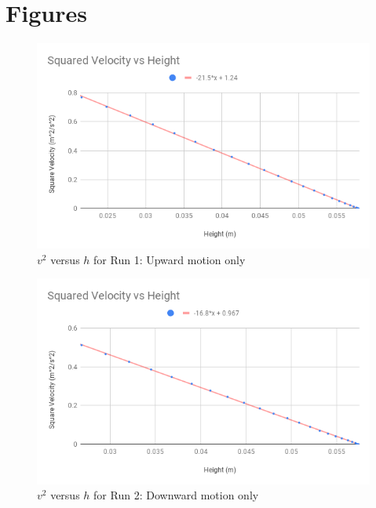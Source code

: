 \section{Figures}
\begin{figure}[ht]
    \centering
    \includegraphics[scale=0.71]{image/07-mechanic/v2-uphill.png}
    \caption{$v^{2}$ versus $h$ for Run 1: Upward motion only}
    \label{figure:07.v2.1}
\end{figure}
\begin{figure}[ht]
    \centering
    \includegraphics[scale=0.71]{image/07-mechanic/v2-downhill.png}
    \caption{$v^{2}$ versus $h$ for Run 2: Downward motion only}
    \label{figure:07.v2.2}
\end{figure}
